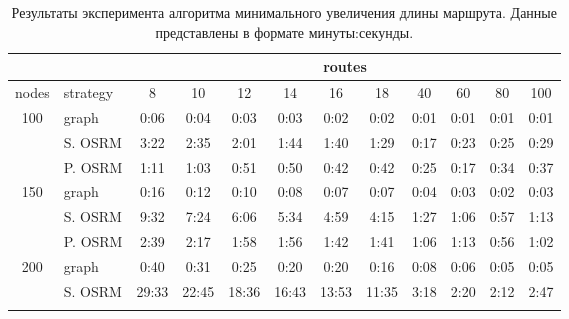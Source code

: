 \documentclass[a4paper, 14pt]{extreport}
\begin{document}
    \begin{table}[ht!]
        \centering
        \caption{Результаты эксперимента алгоритма минимального увеличения длины маршрута. Данные представлены в 
            формате минуты:секунды.}
        \label{tab:second_alg}
        \small
        \begin{tabular}{|c|l|c|c|c|c|c|c|l|l|l|c|}
            \hline
            \multicolumn{1}{|l|}{}      &          & \multicolumn{10}{c|}{routes}                                                                                                       \\ \hline
            \multicolumn{1}{|l|}{nodes} & strategy & 8     & 10    & 12    & 14    & 16    & 18    & \multicolumn{1}{c|}{40} & \multicolumn{1}{c|}{60} & \multicolumn{1}{c|}{80} & 100  \\ \hline
            \multirow{3}{*}{100}        & graph    & 0:06  & 0:04  & 0:03  & 0:03  & 0:02  & 0:02  & 0:01                    & 0:01                    & 0:01                    & 0:01 \\ \cline{2-12} 
            & S. OSRM  & 3:22  & 2:35  & 2:01  & 1:44  & 1:40  & 1:29  & 0:17                    & 0:23                    & 0:25                    & 0:29 \\ \cline{2-12} 
            & P. OSRM  & 1:11  & 1:03  & 0:51  & 0:50  & 0:42  & 0:42  & 0:25                    & 0:17                    & 0:34                    & 0:37 \\ \hline
            \multirow{3}{*}{150}        & graph    & 0:16  & 0:12  & 0:10  & 0:08  & 0:07  & 0:07  & 0:04                    & 0:03                    & 0:02                    & 0:03 \\ \cline{2-12} 
            & S. OSRM  & 9:32  & 7:24  & 6:06  & 5:34  & 4:59  & 4:15  & 1:27                    & 1:06                    & 0:57                    & 1:13 \\ \cline{2-12} 
            & P. OSRM  & 2:39  & 2:17  & 1:58  & 1:56  & 1:42  & 1:41  & 1:06                    & 1:13                    & 0:56                    & 1:02 \\ \hline
            \multirow{3}{*}{200}        & graph    & 0:40  & 0:31  & 0:25  & 0:20  & 0:20  & 0:16  & 0:08                    & 0:06                    & 0:05                    & 0:05 \\ \cline{2-12} 
            & S. OSRM  & 29:33 & 22:45 & 18:36 & 16:43 & 13:53 & 11:35 & 3:18                    & 2:20                    & 2:12                    & 2:47 \\ \cline{2-12} 

\end{tabular}
\end{table}
\end{document}
